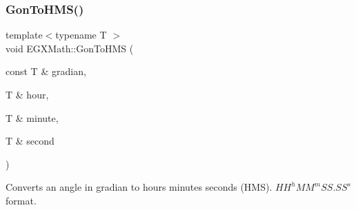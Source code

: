 \subsubsection{\texorpdfstring{Gon\+To\+H\+M\+S()}{GonToHMS()}}
{\footnotesize\ttfamily template$<$typename T $>$ \\
void E\+G\+X\+Math\+::\+Gon\+To\+H\+MS (\begin{DoxyParamCaption}\item[{const T \&}]{gradian,  }\item[{T \&}]{hour,  }\item[{T \&}]{minute,  }\item[{T \&}]{second }\end{DoxyParamCaption})}



Converts an angle in gradian to hours minutes seconds (H\+MS). ${HH}^h{MM}^m{SS.SS}^s$ format. 


